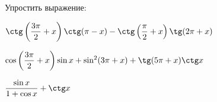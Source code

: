 \begin{class}[number=6]
\begin{listofex}
\begin{enumcols}[itemcolumns=2]
		\end{enumcols}
		\item Упростить выражение:
		\begin{enumcols}[itemcolumns=1]
			\item \( \ctg\left( \dfrac{3\pi}{2}+x \right)\ctg(\pi-x)-\ctg\left( \dfrac{\pi}{2}+x \right)\tg(2\pi+x) \)
			\item \( \cos\left( \dfrac{3\pi}{2}+x \right)\sin x + \sin^2(3\pi+x)+\tg(5\pi+x)\ctg x \)
			\item \( \dfrac{\sin x}{1+\cos x}+\ctg x \)
		\end{enumcols}
	\end{listofex}
\end{class}
%
%
%
%	
%
%
%	
%
%
%	

